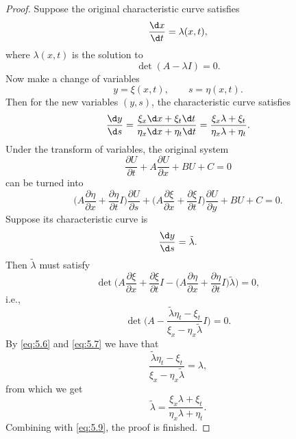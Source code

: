\begin{proof}
  Suppose the original characteristic curve satisfies
  \[ \frac{\d x}{\d t} = \lambda(x,t), \]
  where $\lambda(x,t)$ is the solution to
  \begin{equation}\label{eq:5.6}
    \det(A-\lambda I) = 0.
  \end{equation}
  Now make a change of variables
  \[ y = \xi(x,t),\qquad s = \eta(x,t). \]
  Then for the new variables $(y,s)$, the characteristic curve satisfies
  \begin{equation}\label{eq:5.9}
    \frac{\d y}{\d s} = \frac{\xi_x \d x + \xi_t \d t}{\eta_x \d x + \eta_t \d t}
        = \frac{\xi_x \lambda + \xi_t}{\eta_x \lambda + \eta_t}.
  \end{equation}
  Under the transform of variables, the original system
  \[ \frac{\partial U}{\partial t} + A\frac{\partial U}{\partial x} + BU + C = 0 \]
  can be turned into
  \[ \biggl(A \frac{\partial\eta}{\partial x} + \frac{\partial\eta}{\partial t}I\biggr)
      \frac{\partial U}{\partial s}
      + \biggl(A \frac{\partial\xi}{\partial x} + \frac{\partial\xi}{\partial t}I\biggr)
        \frac{\partial U}{\partial y} + BU + C = 0. \]
  Suppose its characteristic curve is
  \[ \frac{\d y}{\d s} = \tilde\lambda. \] 
  Then $\tilde\lambda$ must satisfy
  \[\det\biggl(A \frac{\partial\xi}{\partial x} + \frac{\partial\xi}{\partial t}I
      - \biggl(A \frac{\partial\eta}{\partial x} + \frac{\partial\eta}{\partial t}I\biggr)\tilde\lambda\biggr) = 0,\]
  i.e.,
  \begin{equation}\label{eq:5.7}
    \det\biggl(A - \frac{\tilde\lambda \eta_t - \xi_t}{\xi_x - \eta_x \tilde\lambda}I\biggr) = 0.
  \end{equation}
  By \eqref{eq:5.6} and \eqref{eq:5.7} we have that
  \[ \frac{\tilde\lambda \eta_t - \xi_t}{\xi_x - \eta_x \tilde\lambda} = \lambda, \]
  from which we get
  \begin{equation}\label{eq:5.8}
    \tilde\lambda = \frac{\xi_x\lambda + \xi_t}{\eta_x\lambda + \eta_t}.
  \end{equation}
  Combining with \eqref{eq:5.9}, the proof is finished.
\end{proof}